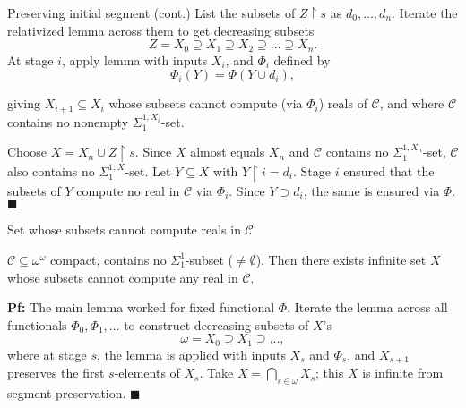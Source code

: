 \begin{frame}{Preserving initial segment (cont.)}
  List the subsets of $Z\restriction s$ as $d_0,\ldots,d_n$. Iterate the
  relativized lemma across them to get decreasing subsets
  \[Z=X_0 \supseteq X_1 \supseteq X_2 \supseteq\ldots \supseteq X_n.\]
  At stage $i$, apply lemma with inputs $X_i$, and $\Phi_i$ defined by
  \[\Phi_i(Y) =\Phi(Y\cup d_i),\]

  giving $X_{i+1}\subseteq X_i$ whose subsets cannot compute (via
  $\Phi_i$) reals of $\mathcal{C}$, and where $\mathcal{C}$ contains no
  nonempty $\Sigma_1^{1,X_i}$-set.

  \vspace{1em}
  Choose $X=X_n\cup Z\restriction s$. Since $X$ almost equals $X_n$ and
  $\mathcal{C}$ contains no $\Sigma_1^{1,X_n}$-set, $\mathcal{C}$ also
  contains no $\Sigma_1^{1,X}$-set. Let $Y\subseteq X$ with $Y\restriction
  i=d_i$. Stage $i$ ensured that the subsets of $Y$ compute no real in
  $\mathcal{C}$ via $\Phi_i$. Since $Y\supset d_i$, the same is ensured via
  $\Phi$. $\blacksquare$
\end{frame}

\begin{frame}{Set whose subsets cannot compute reals in $\mathcal{C}$}
  \begin{main-thm*}
    $\mathcal{C}\subseteq\omega^\omega$ compact, contains no
    $\Sigma_1^1$-subset ($\neq\emptyset$). Then there exists infinite set
    $X$ whose subsets cannot compute any real in $\mathcal{C}$.
  \end{main-thm*}

  \vspace{1em}
  \textbf{Pf:} The main lemma worked for fixed functional $\Phi$. Iterate
  the lemma across all functionals $\Phi_0,\Phi_1,\ldots$ to construct
  decreasing subsets of $X$'s
  \[\omega= X_0\supseteq X_1\supseteq\ldots,\]
  where at stage $s$, the lemma is applied with inputs $X_s$ and
  $\Phi_s$, and $X_{s+1}$ preserves the first $s$-elements of $X_s$. Take
  $X=\bigcap_{s\in\omega}X_s$; this $X$ is infinite from
  segment-preservation. $\blacksquare$
\end{frame}
